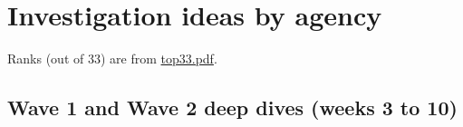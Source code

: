 \documentclass[letterpaper,11pt]{article}
\begin{document}
\hypertarget{investigation-ideas-by-agency}{%
\section{Investigation ideas by
agency}\label{investigation-ideas-by-agency}}

Ranks (out of 33) are from \href{agencies/top33.pdf}{top33.pdf}.

\hypertarget{wave-1-and-wave-2-deep-dives-weeks-3-to-10}{%
\subsection{Wave 1 and Wave 2 deep dives (weeks 3 to
10)}\label{wave-1-and-wave-2-deep-dives-weeks-3-to-10}}

\begingroup\small\setlength{\tabcolsep}{4pt}\renewcommand{\arraystretch}{1.25}
\end{document}
